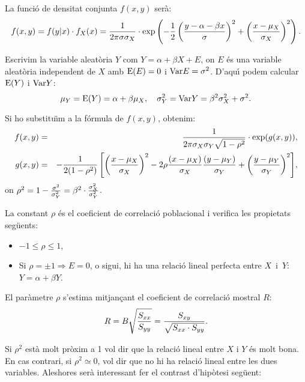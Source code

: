La funci\'o de densitat conjunta $f(x,y)$ ser\`a:
$$f(x,y) = f(y|x) \cdot f_X(x) = {1 \over 2 \pi \sigma \sigma_X} \cdot 
\exp\left({- {1\over 2} \left( {y-\alpha-\beta x \over \sigma} 
\right)^2 + \left( {x - \mu_X \over \sigma_X} \right)^2}\right).$$

Escrivim la variable aleat\`oria $Y$ com $Y = \alpha + \beta X + E$, on $E$ \'es una
variable aleat\`oria independent de $X$ amb ${\rm E} (E) = 0$ i ${\rm Var} E = \sigma^2$. D'aqu\'{\i}
podem calcular ${\rm E} (Y)$ i ${\rm Var} Y$:
$$\mu_Y = {\rm E} (Y) = \alpha + \beta \mu_X, \ \ \ \sigma_Y^2 = {\rm Var} Y = \beta^2
\sigma_X^2 + \sigma^2.$$

Si ho substitu\"{\i}m a la f\'ormula de $f(x,y)$, obtenim:
\begin{eqnarray*}
f(x,y) & = &  {1 \over 2 \pi \sigma_X \sigma_Y \sqrt{1-\rho^2}} \cdot 
\exp (g(x,y)), \\
g(x,y) & = & {- {1 \over 2(1-\rho^2)} \left[ \left( 
{x - \mu_X \over \sigma_X} \right)^2 - 2 \rho {(x - \mu_X) \over \sigma_X}  
{(y - \mu_Y) \over \sigma_Y} + \left( {y - \mu_Y \over
\sigma_Y} \right)^2 \right]},
\end{eqnarray*}
on $\rho^2 = 1 - {\sigma^2 \over \sigma_Y^2} = \beta^2 \cdot {\sigma_X^2 \over
\sigma_Y^2}$.

La constant $\rho$ \'es el coeficient de correlaci\'o poblacional i verifica les
propietats seg\"uents:
\begin{itemize}
\item $-1 \leq \rho \leq 1$,

\item Si $\rho = \pm 1 \Longrightarrow E = 0$, o sigui, hi ha una relaci\'o 
lineal perfecta entre $X$~i~$Y$: $Y = \alpha + \beta Y$.
\end{itemize}

El par\`ametre $\rho$ s'estima mitjan\c cant el coeficient de correlaci\'o 
mostral $R$:
$$R = B \sqrt{{S_{xx} \over S_{yy}}} = {S_{xy} \over \sqrt{S_{xx} \cdot
S_{yy}}}.$$

Si $\rho^2$ est\`a molt pr\`oxim a 1 vol dir que la relaci\'o lineal 
entre $X$ i $Y$ \'es
molt bona. En cas contrari, si $\rho^2 \simeq 0$, vol dir que no hi ha relaci\'o
lineal entre les dues variables. Aleshores ser\`a interessant fer el contrast
d'hip\`otesi seg\"uent:

